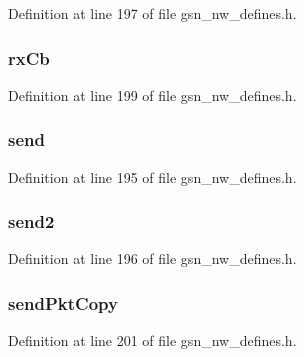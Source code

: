 Definition at line 197 of file gsn\_\-nw\_\-defines.h.

\hypertarget{a00107_a794049b9b975b0c75952070fb5a6494a}{
\subsubsection[{rxCb}]{ {\bf rxCb}}}
\label{a00107_a794049b9b975b0c75952070fb5a6494a}


Definition at line 199 of file gsn\_\-nw\_\-defines.h.

\hypertarget{a00107_a2cb8dfa5211ddbb0a75a3267e6330aaa}{
\subsubsection[{send}]{ {\bf send}}}
\label{a00107_a2cb8dfa5211ddbb0a75a3267e6330aaa}


Definition at line 195 of file gsn\_\-nw\_\-defines.h.

\hypertarget{a00107_a2b201aa3cc79e63d197b25770d1936bc}{
\subsubsection[{send2}]{ {\bf send2}}}
\label{a00107_a2b201aa3cc79e63d197b25770d1936bc}


Definition at line 196 of file gsn\_\-nw\_\-defines.h.

\hypertarget{a00107_afef5ae09a07b0121ce23d69ccaac9470}{
\subsubsection[{sendPktCopy}]{ {\bf sendPktCopy}}}
\label{a00107_afef5ae09a07b0121ce23d69ccaac9470}


Definition at line 201 of file gsn\_\-nw\_\-defines.h.


